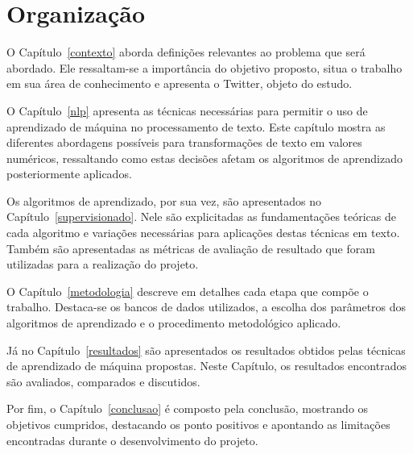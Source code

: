 \section{Organização}

O Capítulo~\ref{contexto} aborda definições relevantes ao problema que será abordado.
Ele ressaltam-se a importância do objetivo proposto, situa o trabalho em sua área de conhecimento e apresenta o Twitter,
objeto do estudo.

O Capítulo~\ref{nlp} apresenta as técnicas necessárias para permitir o uso de aprendizado de máquina no processamento de
texto.
Este capítulo mostra as diferentes abordagens possíveis para transformações de texto em valores numéricos, ressaltando
como estas decisões afetam os algoritmos de aprendizado posteriormente aplicados.

Os algoritmos de aprendizado, por sua vez, são apresentados no Capítulo~\ref{supervisionado}.
Nele são explicitadas as fundamentações teóricas de cada algoritmo e variações necessárias para aplicações destas
técnicas em texto.
Também são apresentadas as métricas de avaliação de resultado que foram utilizadas para a realização do projeto.

O Capítulo~\ref{metodologia} descreve em detalhes cada etapa que compõe o trabalho.
Destaca-se os bancos de dados utilizados, a escolha dos parâmetros dos algoritmos de aprendizado e o procedimento
metodológico aplicado.

Já no Capítulo~\ref{resultados} são apresentados os resultados obtidos pelas técnicas de aprendizado de máquina propostas.
Neste Capítulo, os resultados encontrados são avaliados, comparados e discutidos.

Por fim, o Capítulo~\ref{conclusao} é composto pela conclusão, mostrando os objetivos cumpridos, destacando os ponto
positivos e apontando as limitações encontradas durante o desenvolvimento do projeto.
